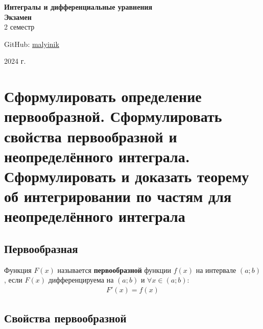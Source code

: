 



\begin{titlepage}
    \vspace*{0pt}
    \vfill
    \centering
    \Huge\textbf{Интегралы и дифференциальные уравнения} \\[7pt]
    \Large\textbf{Экзамен} \\
    \large 2 семестр \\ 
    \vfill
    \begin{flushright}
        \normalsize GitHub: \href{https://github.com/malyinik}{malyinik} \\
    \end{flushright}
    \normalsize 2024 г.
\end{titlepage}
\newpage

\tableofcontents
\newpage

\section{Сформулировать определение первообразной. Сформулировать свойства первообразной и неопределённого интеграла. Сформулировать и доказать теорему об интегрировании по частям для неопределённого интеграла} 

\subsection*{Первообразная}
\begin{definition}
    Функция $F(x)$ называется \textbf{первообразной} функции $f(x)$ на интервале $(a;b)$, если $F(x)$ дифференцируема на $(a;b)$ и $\forall x \in (a;b)\colon$
    \begin{gather*}
        \boxed{F'(x) = f(x)}
    \end{gather*}
\end{definition}

\subsection*{Свойства первообразной}

